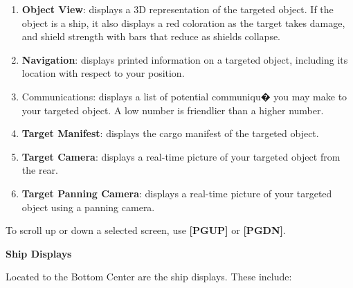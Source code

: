 \documentclass{article}
\begin{document}
\begin{enumerate}
\item  \textbf{Object View}: displays a 3D representation of the targeted object. If the object is a ship, it also displays a red coloration as the target takes damage, and shield strength with bars that reduce as shields collapse. 

\item  \textbf{Navigation}: displays printed information on a targeted object, including its location with respect to your position. 

\item  Communications: displays a list of potential communiqu� you may make to your targeted object. A low number is friendlier than a higher number. 

\item  \textbf{Target Manifest}: displays the cargo manifest of the targeted object. 

\item  \textbf{Target Camera}: displays a real-time picture of your targeted object from the rear. 

\item  \textbf{Target Panning Camera}: displays a real-time picture of your targeted object using a panning camera. 
\end{enumerate}



To scroll up or down a selected screen, use \textbf{[PGUP] }or \textbf{[PGDN]}. 

\textbf{}

\textbf{Ship Displays }

Located to the Bottom Center are the ship displays. These include: 
\end{document}
